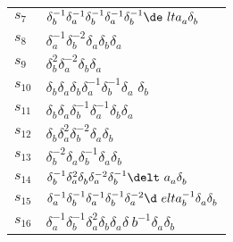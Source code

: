 \documentclass{article}
\begin{document}
\begin{center}
\begin{tabular}{ll}
$s_{7}$ & $\delta_b^{-1}\delta_a^{-1}\delta_b^{-1}\delta_a^{-1}\delta_b^{-1}\de\
lta_a^{}\delta_b^{}$ \\
$s_{8}$ & $\delta_a^{-1}\delta_b^{-2}\delta_a^{}\delta_b^{}\delta_a^{}$ \\
$s_{9}$ & $\delta_b^{2}\delta_a^{-2}\delta_b^{}\delta_a^{}$ \\
$s_{10}$ & $\delta_b^{}\delta_a^{}\delta_b^{}\delta_a^{-1}\delta_b^{-1}\delta_a\
^{}\delta_b^{}$ \\
$s_{11}$ & $\delta_b^{}\delta_a^{}\delta_b^{-1}\delta_a^{-1}\delta_b^{}\delta_a\
^{}$ \\
$s_{12}$ & $\delta_b^{}\delta_a^{2}\delta_b^{-2}\delta_a^{}\delta_b^{}$ \\
$s_{13}$ & $\delta_b^{-2}\delta_a^{}\delta_b^{-1}\delta_a^{}\delta_b^{}$ \\
$s_{14}$ & $\delta_b^{-1}\delta_a^{2}\delta_b^{}\delta_a^{-2}\delta_b^{-1}\delt\
a_a^{}\delta_b^{}$ \\
$s_{15}$ & $\delta_a^{-1}\delta_b^{-1}\delta_a^{-1}\delta_b^{-1}\delta_a^{-2}\d\
elta_b^{-1}\delta_a^{}\delta_b^{}$ \\
$s_{16}$ & $\delta_a^{-1}\delta_b^{-1}\delta_a^{2}\delta_b^{}\delta_a^{}\delta_\
b^{-1}\delta_a^{}\delta_b^{}$ \\
\bottomrule
\end{tabular}
\end{center}

\thispagestyle{empty}
\end{document}
